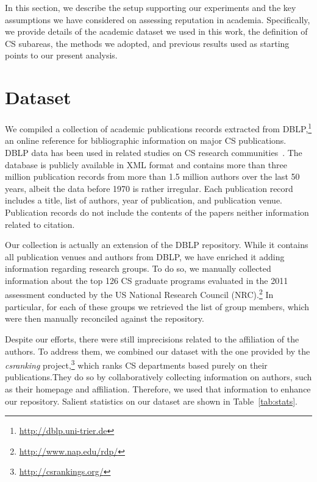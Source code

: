 \documentclass[msc]{ppgccufmg}
\begin{document}
In this section, we describe the setup supporting our experiments and the key assumptions we have considered on assessing reputation in academia. Specifically, we provide details of the academic dataset we used in this work, the definition of CS subareas, the methods we adopted, and previous results used as starting points to our present analysis.

\section{Dataset}


We compiled a collection of academic publications records extracted from DBLP,\footnote{\url{http://dblp.uni-trier.de}} an online reference for bibliographic information on major CS publications. DBLP data has been used in related studies on CS research communities~\citep{wainer13, biryukov10, hoonlor13}. 
%
The database is publicly available in XML format and contains more than three million publication records from more than 1.5 million authors over the last 50 years, albeit the data before 1970 is rather irregular. Each publication record includes a title, list of authors, year of publication, and publication venue. Publication records do not include the contents of the papers neither information related to citation.

Our collection is actually an extension of the DBLP repository. While it contains all publication venues and authors from DBLP, we have enriched it adding information regarding research groups. To do so, we manually collected information about the top 126  CS graduate programs evaluated in the 2011 assessment conducted by the US National Research Council (NRC).\footnote{\url{http://www.nap.edu/rdp/}}
%
In particular, for each of these groups we retrieved the list of group members, which were then manually reconciled against the repository.

Despite our efforts, there were still imprecisions related to the affiliation of the authors. To address them, we combined our dataset with the one provided by the \textit{csranking} project,\footnote{\url{http://csrankings.org/}} which ranks CS departments based purely on their publications.They do so by collaboratively collecting information on authors, such as their homepage and affiliation. Therefore, we used that information to enhance our repository. Salient statistics on our dataset are shown in Table~\ref{tab:stats}.
\end{document}
